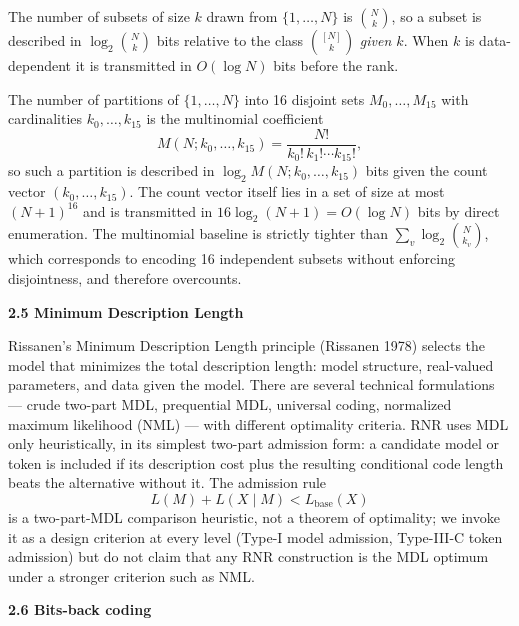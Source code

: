 \documentclass[
]{article}
\begin{document}
The number of subsets of size $k$ drawn from $\{1, \ldots, N\}$ is
$\binom{N}{k}$, so a subset is described in
$\log_2 \binom{N}{k}$ bits relative to the class
$\binom{[N]}{k}$ \emph{given $k$}. When $k$ is data-dependent it is
transmitted in $O(\log N)$ bits before the rank.

The number of partitions of $\{1, \ldots, N\}$ into 16 disjoint sets
$M_0, \ldots, M_{15}$ with cardinalities $k_0, \ldots, k_{15}$ is the
multinomial coefficient
\[
M(N; k_0, \ldots, k_{15}) = \frac{N!}{k_0!\, k_1! \cdots k_{15}!},
\tag{2.2}
\]
so such a partition is described in
$\log_2 M(N; k_0, \ldots, k_{15})$ bits given the count vector
$(k_0, \ldots, k_{15})$. The count vector itself lies in a set of
size at most $(N + 1)^{16}$ and is transmitted in
$16 \log_2(N + 1) = O(\log N)$ bits by direct enumeration. The
multinomial baseline is strictly tighter than
$\sum_v \log_2 \binom{N}{k_v}$, which corresponds to encoding 16
independent subsets without enforcing disjointness, and therefore
overcounts.

\textbf{2.5 Minimum Description Length}

Rissanen's Minimum Description Length principle (Rissanen 1978)
selects the model that minimizes the total description length: model
structure, real-valued parameters, and data given the model. There
are several technical formulations --- crude two-part MDL,
prequential MDL, universal coding, normalized maximum likelihood
(NML) --- with different optimality criteria. RNR uses MDL only
heuristically, in its simplest two-part admission form: a candidate
model or token is included if its description cost plus the resulting
conditional code length beats the alternative without it. The
admission rule
\[
L(M) + L(X \mid M) < L_{\text{base}}(X)
\]
is a two-part-MDL comparison heuristic, not a theorem of optimality;
we invoke it as a design criterion at every level (Type-I model
admission, Type-III-C token admission) but do not claim that any RNR
construction is the MDL optimum under a stronger criterion such as
NML.

\textbf{2.6 Bits-back coding}
\end{document}
